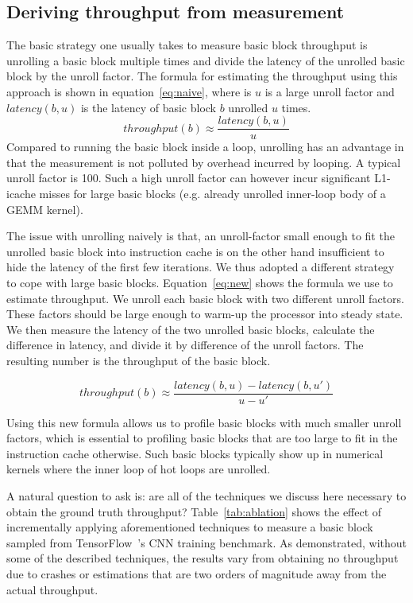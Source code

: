 \subsection{Deriving throughput from measurement}
The basic strategy one usually takes to measure basic block throughput
is unrolling a basic block multiple times and divide the latency of the
unrolled basic block by the unroll factor.
The formula for estimating the throughput using this approach is shown
in equation~\ref{eq:naive}, where is $u$ is a large unroll factor
and $\mathit{latency}(b,u)$ is the latency of basic block $b$
unrolled $u$ times.
\begin{equation}
\mathit{throughput}(b) \approx \frac{\mathit{latency}(b,u)}{u}
\label{eq:naive}
\end{equation}
Compared to running the basic block inside a loop,
unrolling has an advantage in that the measurement is not polluted by
overhead incurred by looping.
A typical unroll factor is 100\cite{ithemal,uops}.
Such a high unroll factor can however incur significant
L1-icache misses for large basic blocks
(e.g. already unrolled inner-loop body of a GEMM kernel).

The issue with unrolling naively is that,
an unroll-factor small enough to fit the 
unrolled basic block into instruction cache is on the other hand
insufficient to hide the latency of the first few iterations.
We thus adopted a different strategy to cope with large basic blocks.
Equation~\ref{eq:new} shows the formula we use to estimate throughput.
We unroll each basic block with two different unroll factors.
These factors should be large enough 
to warm-up the processor into steady state.
We then measure the latency of the two unrolled basic blocks,
calculate the difference in latency, and divide it 
by difference of the unroll factors.
The resulting number is the throughput of the basic block.

\begin{equation}
\mathit{throughput}(b) \approx 
\frac{\mathit{latency}(b, u) - \mathit{latency}(b, u')}{ u - u' }
\label{eq:new}
\end{equation}

Using this new formula allows us to  profile basic blocks with much
smaller unroll factors,
which is essential to profiling basic blocks that 
are too large to fit in the instruction cache otherwise.
Such basic blocks typically show up in numerical kernels where
the inner loop of hot loops are unrolled.

A natural question to ask is: are all of the techniques we discuss
here necessary to obtain the ground truth throughput?
Table~\ref{tab:ablation} shows the effect of incrementally applying
aforementioned techniques to measure a basic block sampled from 
TensorFlow~\cite{tensorflow}'s CNN training benchmark.
As demonstrated, without some of the described techniques,
the results vary from obtaining no throughput due to crashes or
estimations that are two orders of magnitude away from the 
actual throughput.

